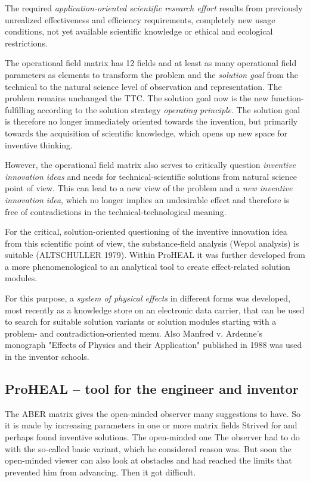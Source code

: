 \documentclass[11pt,a4paper]{article}
\begin{document}
The required \emph{application-oriented scientific research effort} results
from previously unrealized effectiveness and efficiency requirements,
completely new usage conditions, not yet available scientific knowledge or
ethical and ecological restrictions.

The operational field matrix has 12 fields and at least as many operational
field parameters as elements to transform the problem and the \emph{solution
  goal} from the technical to the natural science level of observation and
representation. The problem remains unchanged the TTC. The solution goal now
is the new function-fulfilling according to the solution strategy
\emph{operating principle}. The solution goal is therefore no longer
immediately oriented towards the invention, but primarily towards the
acquisition of scientific knowledge, which opens up new space for inventive
thinking.

However, the operational field matrix also serves to critically question
\emph{inventive innovation ideas} and needs for technical-scientific solutions
from natural science point of view. This can lead to a new view of the problem
and a \emph{new inventive innovation idea}, which no longer implies an
undesirable effect and therefore is free of contradictions in the
technical-technological meaning.

For the critical, solution-oriented questioning of the inventive innovation
idea from this scientific point of view, the substance-field analysis (Wepol
analysis) is suitable (ALTSCHULLER 1979).  Within ProHEAL it was further
developed from a more phenomenological to an analytical tool to create
effect-related solution modules.

For this purpose, a \emph{system of physical effects} in different forms was
developed, most recently as a knowledge store on an electronic data carrier,
that can be used to search for suitable solution variants or solution modules
starting with a problem- and contradiction-oriented menu. Also Manfred
v. Ardenne's monograph "Effects of Physics and their Application"
published in 1988 was used in the inventor schools.  

\subsection{ProHEAL -- tool for the engineer and inventor}

The ABER matrix gives the open-minded observer many suggestions to have. So it
is made by increasing parameters in one or more matrix fields Strived for and
perhaps found inventive solutions. The open-minded one The observer had to do
with the so-called basic variant, which he considered reason was. But soon the
open-minded viewer can also look at obstacles and had reached the limits that
prevented him from advancing. Then it got difficult.
\end{document}
